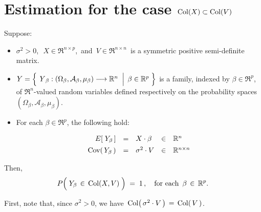 

\section{Estimation for the case $\textnormal{Col}(X) \subset \textnormal{Col}(V)$}
\setcounter{theorem}{0}
\setcounter{equation}{0}

\renewcommand{\theenumi}{\roman{enumi}}
\renewcommand{\labelenumi}{\textnormal{(\theenumi)}$\;\;$}


\begin{proposition}\label{PYinColVEqOne}
\mbox{}
\vskip 0.1cm
\noindent
Suppose:
\begin{itemize}
\item
	$\sigma^{2} > 0$,\,
	\,$X \in \Re^{n \times p}$,\,
	and
	\,$V \in \Re^{n \times n}$\,
	is a symmetric positive semi-definite matrix.
\item
	$Y = \left\{\;
		\left.
		\overset{{\color{white}.}}{Y}_{\beta} : (\Omega_{\beta},\mathcal{A}_{\beta},\mu_{\beta}) \longrightarrow \Re^{n}
		\;\;\right\vert\;
		\beta \in \Re^{p}
		\;\right\}$
	is a family, indexed by $\beta \in \Re^{p}$,
	of $\Re^{n}$-valued random variables defined respectively on the
	probability spaces $(\Omega_{\beta},\mathcal{A}_{\beta},\mu_{\beta})$.
\item
	For each $\beta \in \Re^{p}$, the following hold:
	\begin{equation*}
	\begin{array}{rclcl}
	E\!\left[\;Y_{\beta}\,\right] &  \overset{{\color{white}\vert}}{=} & X \cdot \beta & \in & \Re^{n}
	\\
	\Cov\!\left(\,Y_{\beta}\,\right) & \overset{{\color{white}\vert}}{=} & \sigma^{2} \cdot V & \in & \Re^{n \times n}
	\end{array}
	\end{equation*}
\end{itemize}
Then,
\begin{equation*}
	P\!\left(\;Y_{\beta} \, \overset{{\color{white}.}}{\in} \, \Col(X,V)\;\right) \; = \; 1\,,
	\quad
	\textnormal{for each \,$\beta \,\in\, \Re^{p}$}.
\end{equation*}
\end{proposition}
\proof
First, note that, since $\sigma^{2} > 0$, we have \,$\textnormal{Col}\!\left(\,\sigma^{2} \cdot V\,\right) \,=\, \textnormal{Col}\!\left(\,V\,\right)$.


